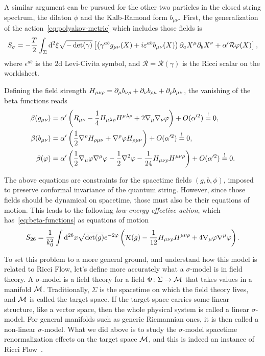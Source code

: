 A similar argument can be pursued for the other two particles in the closed string spectrum, the dilaton $\phi$ and the Kalb-Ramond form $b_{\mu\nu}$. First, the generalization of the action~\eqref{eq:polyakov-metric} which includes those fields is
\begin{equation}
    S_\sigma = -\frac{T}{2} \int_\Sigma \mathop{}\!\mathrm{d}^2 \xi \sqrt{-\det(\gamma)}\left[ \left( \gamma^{ab} g_{\mu\nu}(X) + i \varepsilon^{ab} b_{\mu\nu}(X) \right) \partial_a X^\mu \partial_b X^\nu + \alpha' \mathcal{R} \varphi(X) \right],
\end{equation}
where $\epsilon^{ab}$ is the $2$d Levi-Civita symbol, and $\mathcal{R} = \mathcal{R}(\gamma)$ is the Ricci scalar on the worldsheet.

Defining the field strength $H_{\mu\nu\rho} = \partial_\mu b_{\nu\rho} + \partial_\nu b_{\rho\mu} + \partial_\rho b_{\mu\nu}$, the vanishing of the beta functions reads
\begin{subequations}\label{eq:beta-functions}
\begin{align}
    \beta(g_{\mu\nu}) &= \alpha' \left( R_{\mu\nu} - \frac{1}{4} H_{\mu\lambda\rho} H^{\mu\lambda\rho} + 2 \nabla_\mu \nabla_\nu \varphi \right) + O(\alpha'^2)\overset{!}{=} 0,\\
    \beta(b_{\mu\nu}) &= \alpha' \left( \frac{1}{2} \nabla^\rho H_{\rho\mu\nu} + \nabla^\rho \varphi H_{\rho\mu\nu} \right) + O(\alpha'^2)\overset{!}{=} 0, \\
    \beta(\varphi) &= \alpha' \left( \frac{1}{2} \nabla_\mu \varphi \nabla^\mu \varphi - \frac{1}{2} \nabla^2 \varphi - \frac{1}{24} H_{\mu\nu\rho} H^{\mu\nu\rho} \right) + O(\alpha'^2)\overset{!}{=} 0.
\end{align}
\end{subequations}

The above equations are constraints for the spacetime fields $(g,b,\phi)$, imposed to preserve conformal invariance of the quantum string. However, since those fields should be dynamical on spacetime, those must also be their equations of motion. This leads to the following \emph{low-energy effective action}, which has~\eqref{eq:beta-functions} as equations of motion
\begin{equation}
    S_{26} = \frac{1}{k^2_0} \int \mathop{}\!\mathrm{d}^{26}x \sqrt{\det(g)} e^{-2\varphi} \left( \mathcal{R}(g) - \frac{1}{12} H_{\mu\nu\rho} H^{\mu\nu\rho} + 4 \nabla_\mu \varphi \nabla^\mu \varphi \right).
\end{equation}

To set this problem to a more general ground, and understand how this model is related to Ricci Flow, let's define more accurately what a $\sigma$-model is in field theory. A $\sigma$-model is a field theory for a field $\Phi \colon \Sigma \to \mathcal{M}$ that takes values in a manifold $\mathcal{M}$. Traditionally, $\Sigma$ is the spacetime on which the field theory lives, and $\mathcal{M}$ is called the target space. If the target space carries some linear structure, like a vector space, then the whole physical system is called a linear $\sigma$-model. For general manifolds such as generic Riemannian ones, it is then called a non-linear $\sigma$-model. What we did above is to study the $\sigma$-model spacetime renormalization effects on the target space $\mathcal{M}$, and this is indeed an instance of Ricci Flow~\cite{ricci-flow-renormalization-group}.